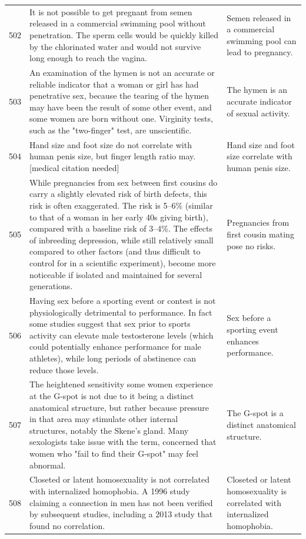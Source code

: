 \begin{tabular}{c|p{}|p{}}
502 & It is not possible to get pregnant from semen released in a commercial swimming pool without penetration. The sperm cells would be quickly killed by the chlorinated water and would not survive long enough to reach the vagina. & Semen released in a commercial swimming pool can lead to pregnancy. \\
503 & An examination of the hymen is not an accurate or reliable indicator that a woman or girl has had penetrative sex, because the tearing of the hymen may have been the result of some other event, and some women are born without one. Virginity tests, such as the "two-finger" test, are unscientific. & The hymen is an accurate indicator of sexual activity. \\
504 & Hand size and foot size do not correlate with human penis size, but finger length ratio may.[medical citation needed] & Hand size and foot size correlate with human penis size. \\
505 & While pregnancies from sex between first cousins do carry a slightly elevated risk of birth defects, this risk is often exaggerated. The risk is 5–6\% (similar to that of a woman in her early 40s giving birth), compared with a baseline risk of 3–4\%. The effects of inbreeding depression, while still relatively small compared to other factors (and thus difficult to control for in a scientific experiment), become more noticeable if isolated and maintained for several generations. & Pregnancies from first cousin mating pose no risks. \\
506 & Having sex before a sporting event or contest is not physiologically detrimental to performance. In fact some studies suggest that sex prior to sports activity can elevate male testosterone levels (which could potentially enhance performance for male athletes), while long periods of abstinence can reduce those levels. & Sex before a sporting event enhances performance. \\
507 & The heightened sensitivity some women experience at the G-spot is not due to it being a distinct anatomical structure, but rather because pressure in that area may stimulate other internal structures, notably the Skene's gland. Many sexologists take issue with the term, concerned that women who "fail to find their G-spot" may feel abnormal. & The G-spot is a distinct anatomical structure. \\
508 & Closeted or latent homosexuality is not correlated with internalized homophobia. A 1996 study claiming a connection in men has not been verified by subsequent studies, including a 2013 study that found no correlation. & Closeted or latent homosexuality is correlated with internalized homophobia. \\

\end{tabular}
